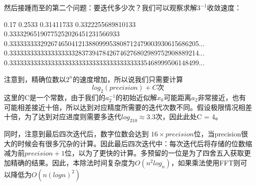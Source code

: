 \documentclass[11pt]{article}
\begin{document}
然后接踵而至的第二个问题：要迭代多少次？我们可以观察求解$3^{-1}$收敛速度：
\begin{commandline}
    0.17
    0.2533
    0.31411733
    0.3322255689810133
    0.33332965190775252026451231566933
    0.3333333332926746504121388099953808712479003930615686205...
    0.3333333333333333333283739478426746276802989752908889214...
    0.3333333333333333333333333333333333333335468999506148499...
\end{commandline}
注意到，精确位数以$2^n$的速度增加，所以说我们只需要计算
$$log_2(precision) + C \text{次}$$
这里的C是一个常数，由于我们的$a_2^{-1}$的初始近似解$x_0$可能距离$a_2$非常接近，也有可能相差接近十倍，所以达到对应精度所需要的迭代次数不同。假设极限情况相差十倍，为了达到对应进度则需要多迭代$log_210 \approx 3.3$次，因此此处C = 4。


同时，注意到最后四次迭代后，数字位数会达到 $16 \times precision$位，当precision很大的时候会有很多冗杂的计算。因此最后四次迭代中：每次迭代后将存储的位数缩减为前$precision +1$位，以为了更快的计算。多预留的一位是为了四舍五入获取更加精确的结果。因此，本除法时间复杂度为$O(n^2log_n)$，如果乘法使用FFT则可以降低为$O(n(logn)^2)$
\end{document}
